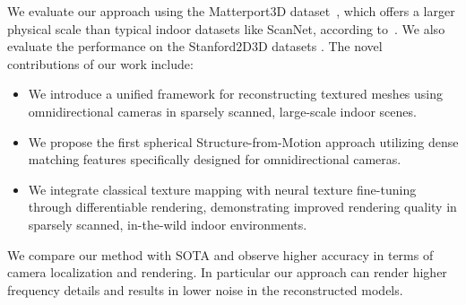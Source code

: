 
We evaluate our approach using the Matterport3D dataset~\cite{chang2017matterport3d}, which offers a larger physical scale than typical indoor datasets like ScanNet, according to~\cite{ramakrishnan2021hm3d}. We also evaluate the performance on
the Stanford2D3D datasets \cite{Stanford2d3d}. The novel contributions of our work include:
\begin{itemize}
    \item We introduce a unified framework for reconstructing textured meshes using omnidirectional cameras in sparsely scanned, large-scale indoor scenes.
    \item We propose the first spherical Structure-from-Motion approach utilizing dense matching features specifically designed for omnidirectional cameras.
    \item We integrate classical texture mapping with neural texture fine-tuning through differentiable rendering, demonstrating improved rendering quality in sparsely scanned, in-the-wild indoor environments. 
\end{itemize}
We  compare our method with SOTA  and observe higher accuracy in terms of camera localization and rendering. In particular our approach can render higher frequency details and results in lower noise in the reconstructed models.
